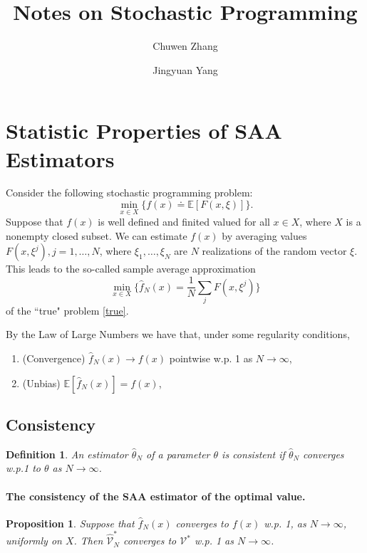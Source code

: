 \documentclass[a4pper,11pt]{article}
\title{Notes on Stochastic Programming}
\newcommand{\be}{\mathbb E}
\newtheorem{defn}[thm]{Definition}
\newtheorem{prop}[thm]{Proposition}
\begin{document}
\author[1]{\small Chuwen Zhang}
\author[1]{\small Jingyuan Yang}
\maketitle

\section{Statistic Properties of SAA Estimators}
Consider the following stochastic programming problem:
\begin{equation}
\min_{x\in X} \{f(x)\doteq \be [F(x,\xi)]\}.\label{true}
\end{equation}
Suppose that $f(x)$ is well defined and finited valued for all $x\in X$, where $X$ is a nonempty closed subset.
We can estimate $f(x)$ by averaging values $F(x,\xi^j),j=1,…,N$, where $\xi_1,\dots,\xi_N$ are $N$ realizations of the random vector $\xi$. This leads to the so-called sample average approximation
\begin{equation}
\min_{x\in X}\{\hat f_N(x)=\frac{1}{N}\sum_{j}F(x,\xi^j)\}\label{SAA}
\end{equation}
of the ``true" problem \eqref{true}.

By the Law of Large Numbers we have that, under some regularity conditions,
\begin{enumerate}
	\item (Convergence) $\hat f_N(x)\to f(x)$ pointwise w.p. 1 as $N\to \infty$,
	\item (Unbias) $\be [\hat f_N(x)]=f(x)$,
\end{enumerate}
\subsection{Consistency}
\begin{defn}
An estimator $\hat \theta_N$ of a parameter $\theta$ is consistent if $\hat \theta_N$ converges w.p.1 to $\theta$ as $N\to \infty$.
 \end{defn}
 
 
 
 \paragraph{The consistency of the SAA estimator of the optimal value.}
 \begin{prop}
 Suppose that $\hat f_N(x)$ converges to $f(x)$ w.p. 1, as $N\to \infty$, uniformly on $X$. Then $\hat {\mathcal V}_N^*$ converges to $\mathcal V^*$ w.p. 1 as $N\to \infty$.
 \end{prop}
 
\end{document}
